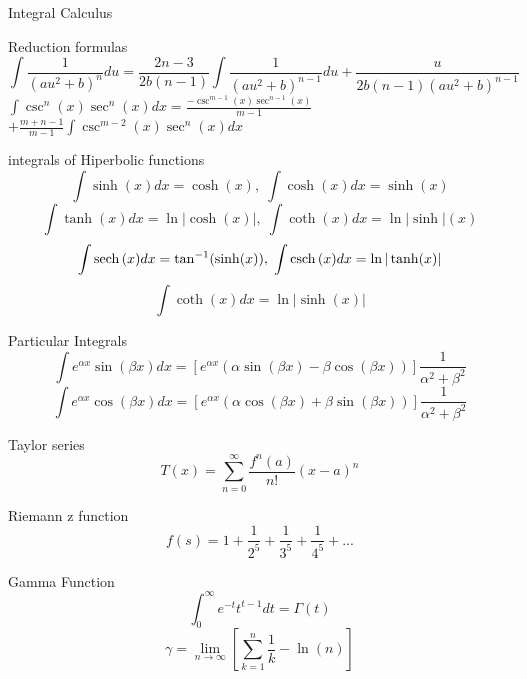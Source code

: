 \begin{section}{Integral Calculus}
\begin{subsection}{Reduction formulas}
		$$\int \frac{1}{(au^2 + b)^n } du = \frac{2n-3}{2b(n-1)} \int \frac{1}{(au^2 + b )^{n-1}} du + \frac{u}{2b(n-1)(au^2 + b ) ^{n-1}}$$
		$ \int \csc^n (x) \sec^n (x) dx = \frac{-\csc^{m-1} (x) \sec^{n-1} (x) } {m-1} $ $+\frac{m + n-1} {m-1} \int \csc^{m-2} (x) \sec^{n} (x) dx $

	\end{subsection}
	\begin{subsection}{integrals of Hiperbolic functions}
		$$\int \sinh (x) dx = \cosh (x) , \; \int \cosh (x) dx = \sinh (x)$$ 
		$$\int \tanh (x) dx = \ln \vert \cosh (x) \vert , \; \int \coth (x) dx = \ln \vert \sinh \vert (x)$$ 
		$$\int \mathrm{sech} \, (x) dx = \tan^{-1} (\sinh (x) ) , \; \int \mathrm{csch} \, (x) dx = \ln \vert \tanh (x) \vert $$
		$$\int \coth (x) dx = \ln \vert \sinh (x) \vert $$
	\end{subsection}
	\begin{subsection}{Particular Integrals}
$$		\int e^{\alpha x} \sin (\beta x ) dx  = [e^{\alpha x } (\alpha \sin ( \beta x ) - \beta \cos ( \beta x )) ] \frac{1}{\alpha^2 + \beta^2} $$
$$		\int e^{\alpha x} \cos (\beta x ) dx  = [e^{\alpha x } (\alpha \cos ( \beta x ) + \beta \sin ( \beta x )) ] \frac{1}{\alpha^2 + \beta^2} $$

	\end{subsection}
	\begin{subsection}{Taylor series}
		$$T(x) = \sum_{n=0}^{\infty } \frac{f^{n}(a)}{n!} (x-a)^{n}$$
	\end{subsection}
	\begin{subsection}{Riemann z function}
		$$f(s) = 1 + \frac{1}{2^5} + \frac{1}{3^5} + \frac{1}{4^5} +... $$
	\end{subsection}
	\begin{subsection}{Gamma Function}
		$$\int_{0}^{\infty} e^{-t}t^{t-1} dt = \Gamma (t) $$
		$$\gamma = \lim_{n \rightarrow \infty } [ \sum_{k=1}^{n} \frac{1}{k} - \ln (n) ] $$
	\end{subsection}
\end{section}
